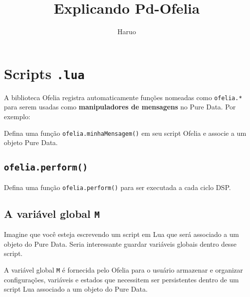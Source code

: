 \documentclass{article}
\title{Explicando Pd-Ofelia}
\author{Haruo}
\date{}
\begin{document}
\maketitle

\section{Scripts \texttt{.lua}}

A biblioteca Ofelia registra automaticamente funções nomeadas como \texttt{ofelia.*} para serem usadas como \textbf{manipuladores de mensagens} no Pure Data.
Por exemplo:

Defina uma função \texttt{ofelia.minhaMensagem()} em seu script Ofelia e associe a um objeto Pure Data. 

\subsection{\texttt{ofelia.perform()}}

Defina uma função \texttt{ofelia.perform()} para ser executada a cada ciclo DSP.

\subsection{A variável global \texttt{M}}

Imagine que você esteja escrevendo um script em Lua que será associado a um objeto do Pure Data.
Seria interessante guardar variáveis globais dentro desse script.

A variável global \texttt{M} é fornecida pelo Ofelia para o usuário armazenar e organizar configurações, variáveis e estados que necessitem ser persistentes dentro de um script Lua associado a um objeto do Pure Data.
\end{document}
